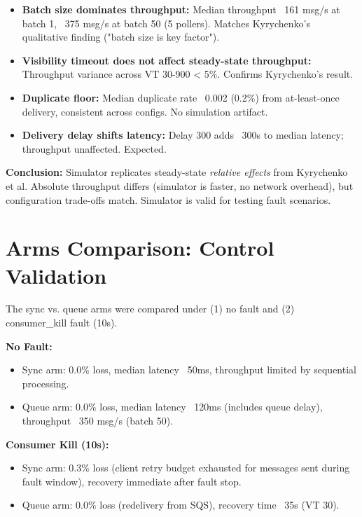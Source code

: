 \begin{itemize}
    \item \textbf{Batch size dominates throughput:} Median throughput ~161 msg/s at batch 1, ~375 msg/s at batch 50 (5 pollers). Matches Kyrychenko's qualitative finding ("batch size is key factor").
    
    \item \textbf{Visibility timeout does not affect steady-state throughput:} Throughput variance across VT 30-900 < 5\%. Confirms Kyrychenko's result.
    
    \item \textbf{Duplicate floor:} Median duplicate rate ~0.002 (0.2\%) from at-least-once delivery, consistent across configs. No simulation artifact.
    
    \item \textbf{Delivery delay shifts latency:} Delay 300 adds ~300s to median latency; throughput unaffected. Expected.
\end{itemize}

\textbf{Conclusion:} Simulator replicates steady-state \emph{relative effects} from Kyrychenko et al. Absolute throughput differs (simulator is faster, no network overhead), but configuration trade-offs match. Simulator is valid for testing fault scenarios.

\section{Arms Comparison: Control Validation}

The sync vs. queue arms were compared under (1) no fault and (2) consumer\_kill fault (10s).

\textbf{No Fault:}
\begin{itemize}
    \item Sync arm: 0.0\% loss, median latency ~50ms, throughput limited by sequential processing.
    \item Queue arm: 0.0\% loss, median latency ~120ms (includes queue delay), throughput ~350 msg/s (batch 50).
\end{itemize}

\textbf{Consumer Kill (10s):}
\begin{itemize}
    \item Sync arm: 0.3\% loss (client retry budget exhausted for messages sent during fault window), recovery immediate after fault stop.
    \item Queue arm: 0.0\% loss (redelivery from SQS), recovery time ~35s (VT 30).
\end{itemize}

